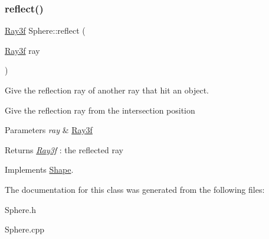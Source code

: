 \mbox{\label{class_sphere_a4ba50719ce557c0ff9a85333d0524bad}} 
\subsubsection{\texorpdfstring{reflect()}{reflect()}}
{\footnotesize\ttfamily \mbox{\hyperlink{class_ray3f}{Ray3f}} Sphere\+::reflect (\begin{DoxyParamCaption}\item[{\mbox{\hyperlink{class_ray3f}{Ray3f}}}]{ray }\end{DoxyParamCaption})\hspace{0.3cm}{\ttfamily [virtual]}}



Give the reflection ray of another ray that hit an object. 

Give the reflection ray from the intersection position 
\begin{DoxyParams}{Parameters}
{\em ray} & \mbox{\hyperlink{class_ray3f}{Ray3f}} \\
\hline
\end{DoxyParams}
\begin{DoxyReturn}{Returns}
{\itshape \mbox{\hyperlink{class_ray3f}{Ray3f}}} \+: the reflected ray 
\end{DoxyReturn}


Implements \mbox{\hyperlink{class_shape_a7cc30a4c8e9564c51f6ab36554aa5cfc}{Shape}}.



The documentation for this class was generated from the following files\+:\begin{DoxyCompactItemize}
\item 
Sphere.\+h\item 
Sphere.\+cpp\end{DoxyCompactItemize}
